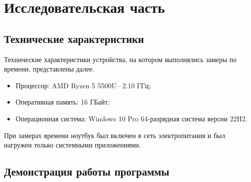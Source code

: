 \chapter{Исследовательская часть}

\section{Технические характеристики}

Технические характеристики устройства, на котором выполнялись замеры по времени, представлены далее.

\begin{itemize}
	\item Процессор: AMD Ryzen 5 5500U\,--\,2.10 ГГц;
	\item Оперативная память: 16 ГБайт;
	\item Операционная система: Windows 10 Pro 64-разрядная система версии 22H2.
\end{itemize}

При замерах времени ноутбук был включен в сеть электропитания и был нагружен только системными приложениями.

\section{Демонстрация работы программы}

